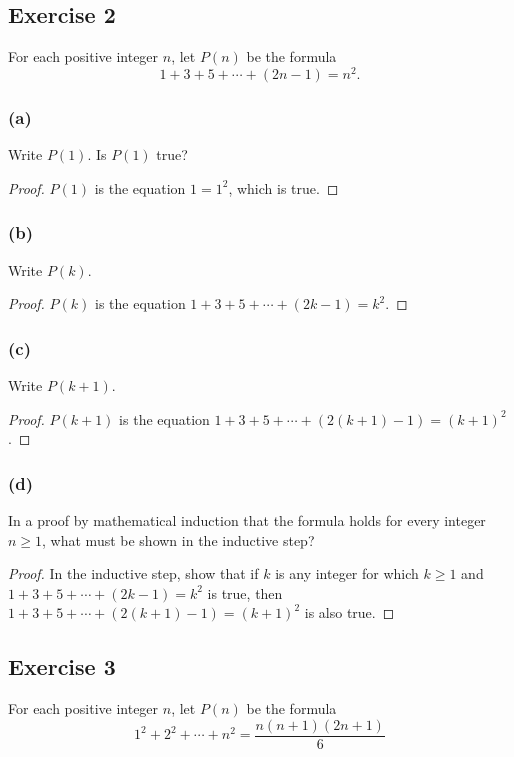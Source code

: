 \documentclass[14pt]{extarticle}
\begin{document}
\subsection{Exercise 2}
For each positive integer $n$, let $P(n)$ be the formula
\[
1 + 3 + 5 + \cdots + (2n - 1) = n^2.
\]
\subsubsection{(a)}
Write $P(1)$. Is $P(1)$ true?

\begin{proof}
$P(1)$ is the equation $1 = 1^2$, which is true.
\end{proof}

\subsubsection{(b)}
Write $P(k)$.

\begin{proof}
$P(k)$ is the equation $1 + 3 + 5 + \cdots + (2k - 1) = k^2$.
\end{proof}

\subsubsection{(c)}
Write $P(k + 1)$.

\begin{proof}
$P(k + 1)$ is the equation $1 + 3 + 5 + \cdots + (2(k + 1) - 1) = (k + 1)^2$.
\end{proof}

\subsubsection{(d)}
In a proof by mathematical induction that the formula holds for every integer $n \geq 1$, what must be shown in the inductive step?

\begin{proof}
In the inductive step, show that if $k$ is any integer for which $k \geq 1$ and $1 + 3 + 5 + \cdots + (2k - 1) = k^2$ is true, then $1 + 3 + 5 + \cdots + (2(k + 1) - 1) = (k + 1)^2$ is also true.
\end{proof}

\subsection{Exercise 3}
For each positive integer $n$, let $P(n)$ be the formula
\[
1^2 + 2^2 + \cdots + n^2 = \frac{n(n+1)(2n+1)}{6}
\]
\end{document}
